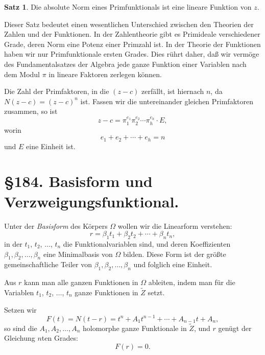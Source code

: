 \documentclass[12pt,a4paper]{article}
\theoremstyle{definition}
\newtheorem{satz}{Satz}[section]
\begin{document}
\begin{satz}
Die absolute Norm eines Primfunktionals ist eine lineare Funktion von $z$.
\end{satz}

Dieser Satz bedeutet einen wesentlichen Unterschied zwischen den Theorien der Zahlen und der Funktionen. In der Zahlentheorie gibt es Primideale verschiedener Grade, deren Norm eine Potenz einer Primzahl ist. In der Theorie der Funktionen haben wir nur Primfunktionale ersten Grades. Dies rührt daher, daß wir vermöge des Fundamentalsatzes der Algebra jede ganze Funktion einer Variablen nach dem Modul $\pi$ in lineare Faktoren zerlegen können.

Die Zahl der Primfaktoren, in die $(z - c)$ zerfällt, ist hiernach $n$, da $N(z-c) = (z-c)^n$ ist. Fassen wir die untereinander gleichen Primfaktoren zusammen, so ist
\begin{equation}
z - c = \pi_1^{e_1}\pi_2^{e_2}\cdots\pi_h^{e_h} \cdot E,
\end{equation}
worin
\begin{equation}
e_1 + e_2 + \cdots + e_h = n
\end{equation}
und $E$ eine Einheit ist.

\newpage
\section*{\S 184. Basisform und Verzweigungsfunktional.}

Unter der \emph{Basisform} des Körpers $\Omega$ wollen wir die Linearform verstehen:
\begin{equation}
r = \beta_1t_1 + \beta_2t_2 + \cdots + \beta_nt_n,
\end{equation}
in der $t_1$, $t_2$, $\ldots$, $t_n$ die Funktionalvariablen sind, und deren Koeffizienten $\beta_1, \beta_2, \ldots, \beta_n$ eine Minimalbasis von $\Omega$ bilden. Diese Form ist der größte gemeinschaftliche Teiler von $\beta_1, \beta_2, \ldots, \beta_n$ und folglich eine Einheit.

Aus $r$ kann man alle ganzen Funktionen in $\Omega$ ableiten, indem man für die Variablen $t_1$, $t_2$, $\ldots$, $t_n$ ganze Funktionen in $\tilde{Z}$ setzt.

Setzen wir
\begin{equation}
F(t) = N(t - r) = t^n + A_1t^{n-1} + \cdots + A_{n-1}t + A_n,
\end{equation}
so sind die $A_1, A_2, \ldots, A_n$ holomorphe ganze Funktionale in $\tilde{Z}$, und $r$ genügt der Gleichung $n$ten Grades:
\[F(r) = 0.\]
\end{document}
